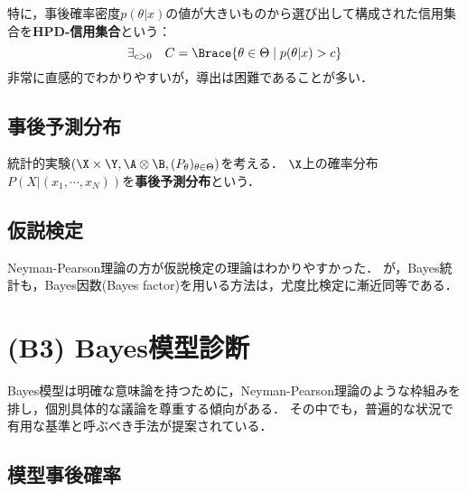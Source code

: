 \documentclass[uplatex,dvipdfmx]{jsreport}
\begin{document}
\begin{example}
    特に，事後確率密度$p(\theta|x)$の値が大きいものから選び出して構成された信用集合を\textbf{HPD-信用集合}という：
    \[\exists_{c>0}\quad C=\Brace{\theta\in\Theta\mid p(\theta|x)>c}\]
    非常に直感的でわかりやすいが，導出は困難であることが多い．
\end{example}

\subsection{事後予測分布}

\begin{definition}
    統計的実験$(\X\times\Y,\A\otimes\B,(P_\theta)_{\theta\in\Theta})$を考える．
    $\X$上の確率分布$P(X|(x_1,\cdots,x_N))$を\textbf{事後予測分布}という．
\end{definition}



\subsection{仮説検定}

\begin{tcolorbox}[colframe=ForestGreen, colback=ForestGreen!10!white,breakable,colbacktitle=ForestGreen!40!white,coltitle=black,fonttitle=\bfseries\sffamily,
title=]
    Neyman-Pearson理論の方が仮説検定の理論はわかりやすかった．
    が，Bayes統計も，Bayes因数(Bayes factor)を用いる方法は，尤度比検定に漸近同等である．
\end{tcolorbox}

\section{(B3) Bayes模型診断}

\begin{tcolorbox}[colframe=ForestGreen, colback=ForestGreen!10!white,breakable,colbacktitle=ForestGreen!40!white,coltitle=black,fonttitle=\bfseries\sffamily,
title=]
    Bayes模型は明確な意味論を持つために，Neyman-Pearson理論のような枠組みを排し，個別具体的な議論を尊重する傾向がある．
    その中でも，普遍的な状況で有用な基準と呼ぶべき手法が提案されている．
\end{tcolorbox}

\subsection{模型事後確率}
\end{document}
